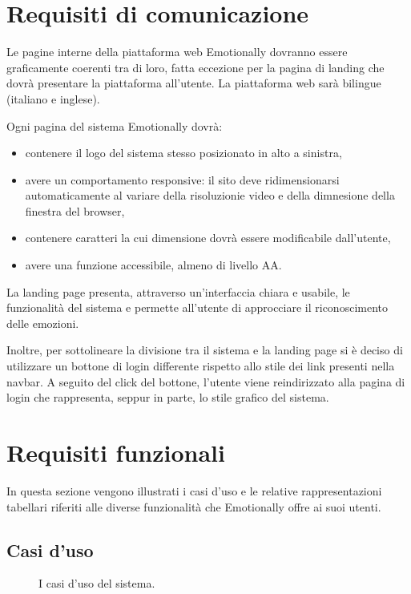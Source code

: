 
\section{Requisiti di comunicazione}\label{sec:requisiti-di-comunicazione}
Le pagine interne della piattaforma web Emotionally dovranno essere 
graficamente coerenti tra di loro, fatta eccezione per la pagina di landing che 
dovrà presentare la piattaforma all'utente. La piattaforma web sarà bilingue 
(italiano e inglese).

Ogni pagina del sistema Emotionally dovrà:
\begin{itemize}
	\item contenere il logo del sistema stesso posizionato in alto a sinistra,
	\item avere un comportamento responsive: il sito deve ridimensionarsi 
	automaticamente al variare della risoluzionie video e della dimnesione 
	della finestra del browser,
	\item contenere caratteri la cui dimensione dovrà essere modificabile 
	dall'utente,
	\item avere una funzione accessibile, almeno di livello AA.
\end{itemize}
La landing page presenta, attraverso un'interfaccia chiara e usabile, le 
funzionalità del sistema e permette all'utente di approcciare il riconoscimento 
delle emozioni. 

Inoltre, per sottolineare la divisione tra il sistema e la landing page si è 
deciso di utilizzare un bottone di login differente rispetto allo stile dei 
link presenti nella navbar. A seguito del click del bottone, l'utente viene 
reindirizzato alla pagina di login che rappresenta, seppur in parte, lo stile 
grafico del sistema.

\section{Requisiti funzionali}\label{sec:requisiti-funzionali}

In questa sezione vengono illustrati i casi d'uso e le relative 
rappresentazioni tabellari riferiti alle diverse funzionalità che Emotionally 
offre ai suoi utenti. 

\subsection{Casi d'uso}

\begin{figure}[H]
	\centering
    \caption{I casi d'uso del sistema.}
    \label{fig:casi-duso}
    \resizebox{\textwidth}{!}{%
        
    }
\end{figure}

